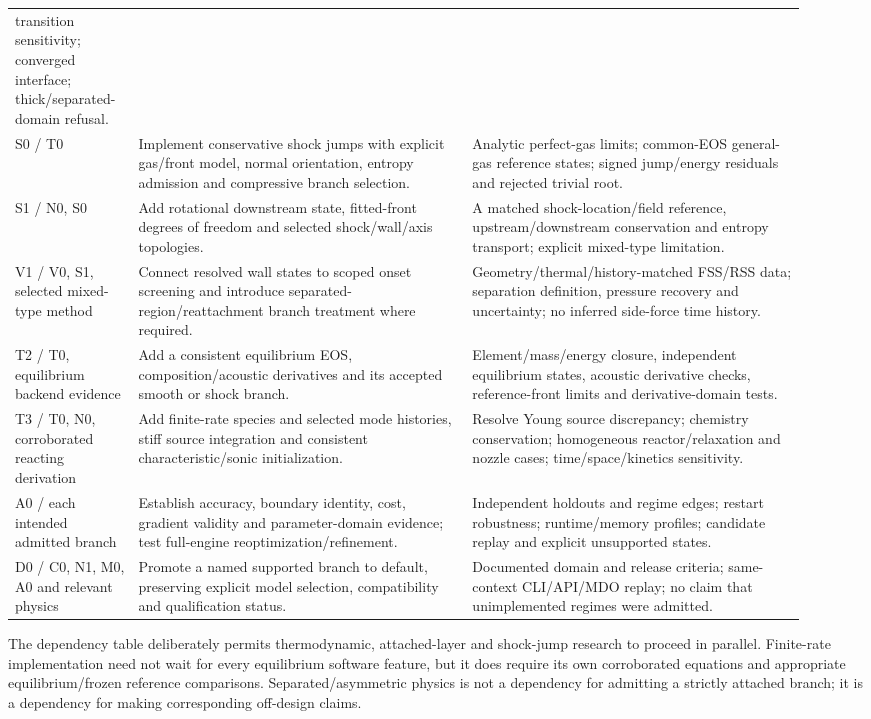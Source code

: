 \begin{longtable}{@{}P{0.14\linewidth}P{0.39\linewidth}P{0.39\linewidth}@{}}
transition sensitivity; converged interface; thick/separated-domain refusal.\\
S0 / T0 &
Implement conservative shock jumps with explicit gas/front model,
normal orientation, entropy admission and compressive branch selection. &
Analytic perfect-gas limits; common-EOS general-gas reference states;
signed jump/energy residuals and rejected trivial root.\\
S1 / N0, S0 &
Add rotational downstream state, fitted-front degrees of freedom and
selected shock/wall/axis topologies. &
A matched shock-location/field reference, upstream/downstream
conservation and entropy transport; explicit mixed-type limitation.\\
V1 / V0, S1, selected mixed-type method &
Connect resolved wall states to scoped onset screening and introduce
separated-region/reattachment branch treatment where required. &
Geometry/thermal/history-matched FSS/RSS data; separation definition,
pressure recovery and uncertainty; no inferred side-force time history.\\
T2 / T0, equilibrium backend evidence &
Add a consistent equilibrium EOS, composition/acoustic derivatives and
its accepted smooth or shock branch. &
Element/mass/energy closure, independent equilibrium states, acoustic
derivative checks, reference-front limits and derivative-domain tests.\\
T3 / T0, N0, corroborated reacting derivation &
Add finite-rate species and selected mode histories, stiff source
integration and consistent characteristic/sonic initialization. &
Resolve Young source discrepancy; chemistry conservation; homogeneous
reactor/relaxation and nozzle cases; time/space/kinetics sensitivity.\\
A0 / each intended admitted branch &
Establish accuracy, boundary identity, cost, gradient validity and
parameter-domain evidence; test full-engine reoptimization/refinement. &
Independent holdouts and regime edges; restart robustness; runtime/memory
profiles; candidate replay and explicit unsupported states.\\
D0 / C0, N1, M0, A0 and relevant physics &
Promote a named supported branch to default, preserving explicit model
selection, compatibility and qualification status. &
Documented domain and release criteria; same-context CLI/API/MDO
replay; no claim that unimplemented regimes were admitted.\\
\bottomrule
\end{longtable}
\endgroup

The dependency table deliberately permits thermodynamic, attached-layer
and shock-jump research to proceed in parallel. Finite-rate implementation
need not wait for every equilibrium software feature, but it does require
its own corroborated equations and appropriate equilibrium/frozen
reference comparisons. Separated/asymmetric physics is not a dependency
for admitting a strictly attached branch; it is a dependency for making
corresponding off-design claims.

